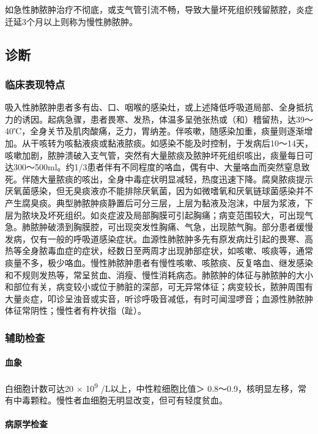 如急性肺脓肿治疗不彻底，或支气管引流不畅，导致大量坏死组织残留脓腔，炎症迁延3个月以上则称为慢性肺脓肿。

\subsection{诊断}

\subsubsection{临床表现特点}

吸入性肺脓肿患者多有齿、口、咽喉的感染灶，或上述降低呼吸道局部、全身抵抗力的诱因。起病急骤，患者畏寒、发热，体温多呈弛张热或（和）稽留热，达39～40℃，全身关节及肌肉酸痛，乏力，胃纳差。伴咳嗽，随感染加重，痰量则逐渐增加。从干咳转为咳黏液痰或黏液脓痰。如感染不能及时控制，于发病后10～14天，咳嗽加剧，脓肿溃破入支气管，突然有大量脓痰及脓肿坏死组织咳出，痰量每日可达300～500ml。约1/3患者伴有不同程度的咯血，偶有中、大量咯血而突然窒息致死。伴随大量脓痰的咳出，全身中毒症状明显减轻，热度迅速下降。腐臭脓痰提示厌氧菌感染，但无臭痰液亦不能排除厌氧菌，因为如微嗜氧和厌氧链球菌感染并不产生腐臭痰。典型肺脓肿痰静置后可分三层，上层为黏液及泡沫，中层为浆液，下层为脓块及坏死组织。如炎症波及局部胸膜可引起胸痛；病变范围较大，可出现气急。肺脓肿破溃到胸膜腔，可出现突发性胸痛、气急，出现脓气胸。部分患者缓慢发病，仅有一般的呼吸道感染症状。血源性肺脓肿多先有原发病灶引起的畏寒、高热等全身脓毒血症的症状，经数日至两周才出现肺部症状，如咳嗽、咳痰等，通常痰量不多，极少咯血。慢性肺脓肿患者有慢性咳嗽、咳脓痰、反复咯血、继发感染和不规则发热等，常呈贫血、消瘦、慢性消耗病态。肺脓肿的体征与肺脓肿的大小和部位有关，病变较小或位于肺脏的深部，可无异常体征；病变较长，脓肿周围有大量炎症，叩诊呈浊音或实音，听诊呼吸音减低，有时可闻湿啰音；血源性肺脓肿体征常阴性；慢性者有杵状指（趾）。

\subsubsection{辅助检查}

\paragraph{血象}

白细胞计数可达20 × 10\textsuperscript{9} /L以上，中性粒细胞比值＞
0.8～0.9，核明显左移，常有中毒颗粒。慢性者血细胞无明显改变，但可有轻度贫血。

\paragraph{病原学检查}

